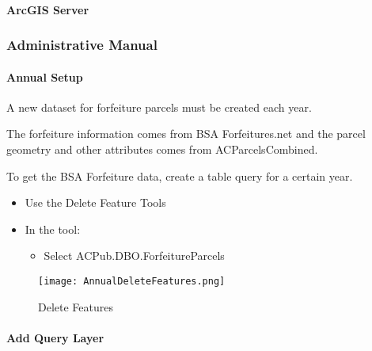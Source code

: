 \paragraph{ArcGIS Server}
\clearpage
\subsubsection{Administrative Manual}
\vspace{.25in}

\paragraph[Annual Setup]{Annual Setup \texorpdfstring{\\}{}}

A new dataset for forfeiture parcels must be created each year.

\noindent The forfeiture information comes from BSA Forfeitures.net and the parcel geometry and other attributes comes from ACParcelsCombined.
\vspace{.25in}

\noindent To get the BSA Forfeiture data, create a table query for a certain year.
\vspace{.25in}

\vspace{.25in}

\begin{itemize}
\item {\Large Use the Delete Feature Tools}
\item {\Large In the tool:}
\begin{itemize}
\item Select ACPub.DBO.ForfeitureParcels
\end{itemize}
\end{itemize}
\vspace{.25in}

\begin{figure}[h!]
\centering
    \texttt{[image: AnnualDeleteFeatures.png]}
\caption{Delete Features}
\end{figure}
\vspace{.25in}

\clearpage
\paragraph[Add Query Layer]{Add Query Layer \texorpdfstring{\\}{}}
\vspace{.25in}

